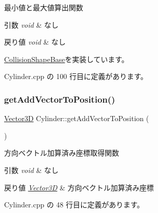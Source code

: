 最小値と最大値算出関数 


\begin{DoxyParams}{引数}
{\em void} & なし \\
\hline
\end{DoxyParams}

\begin{DoxyRetVals}{戻り値}
{\em void} & なし \\
\hline
\end{DoxyRetVals}


\mbox{\hyperlink{class_collision_shape_base_ad227c2f83038d7c05bc6b1d510cb4000}{Collision\+Shape\+Base}}を実装しています。



 Cylinder.\+cpp の 100 行目に定義があります。

\mbox{\label{class_cylinder_af36a39d5a18d1a837d9880a00447d87b}} 
\subsubsection{\texorpdfstring{get\+Add\+Vector\+To\+Position()}{getAddVectorToPosition()}}
{\footnotesize\ttfamily \mbox{\hyperlink{class_vector3_d}{Vector3D}} Cylinder\+::get\+Add\+Vector\+To\+Position (\begin{DoxyParamCaption}{ }\end{DoxyParamCaption})}



方向ベクトル加算済み座標取得関数 


\begin{DoxyParams}{引数}
{\em void} & なし \\
\hline
\end{DoxyParams}

\begin{DoxyRetVals}{戻り値}
{\em \mbox{\hyperlink{class_vector3_d}{Vector3D}}} & 方向ベクトル加算済み座標 \\
\hline
\end{DoxyRetVals}


 Cylinder.\+cpp の 48 行目に定義があります。

\mbox{\label{class_cylinder_af6e950f09496e5aac060a3f297da3ae2}} 
